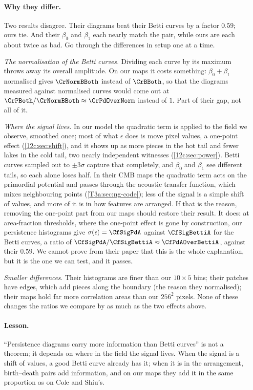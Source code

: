 \paragraph{Why they differ.} Two results disagree. Their diagrams beat their Betti curves by a factor $0.59$; ours tie. And their $\beta_0$ and
$\beta_1$ each nearly match the pair, while ours are each about twice as bad. Go through the differences in setup one at a time.

\emph{The normalisation of the Betti curves.} Dividing each curve by its maximum throws away its overall amplitude. On our maps it costs
something: $\beta_0+\beta_1$ normalised gives $\CrNormBBoth$ instead of $\CrBBoth$, so that the diagrams measured against normalised curves would come out at
$\CrPBoth/\CrNormBBoth\approx\CrPdOverNorm$ instead of $1$. Part of their gap, not all of it.

\emph{Where the signal lives.} In our model the quadratic term is applied to the field we observe, smoothed once; most of what $\epsilon$ does is
move pixel values, a one-point effect (\cref{12c:sec:shift}), and it shows up as more pieces in the hot tail and fewer lakes in the cold tail,
two nearly independent witnesses (\cref{12c:sec:power}). Betti curves sampled out to $\pm3\sigma$ capture that completely, and $\beta_0$ and
$\beta_1$ see different tails, so each alone loses half. In their CMB maps the quadratic term acts on the primordial potential and passes
through the acoustic transfer function, which mixes neighbouring points (\cref{T3a:sec:ng-code}); less of the signal is a simple shift of values,
and more of it is in how features are arranged. If that is the reason, removing the one-point part from our maps should restore their
result. It does: at area-fraction thresholds, where the one-point effect is gone by construction, our persistence histograms give
$\sigma(\epsilon)=\CfSigPdA$ against $\CfSigBettiA$ for the Betti curves, a ratio of $\CfSigPdA/\CfSigBettiA\approx\CfPdAOverBettiA$, against
their $0.59$. We cannot prove from their paper
that this is the whole explanation, but it is the one we can test, and it passes.

\emph{Smaller differences.} Their histograms are finer than our $10\times5$ bins; their patches have edges, which add pieces along the boundary
(the reason they normalised); their maps hold far more correlation areas than our $256^2$ pixels. None of these changes the ratios we compare
by as much as the two effects above.

\paragraph{Lesson.} ``Persistence diagrams carry more information than Betti curves'' is not a theorem; it depends on where in the field the signal
lives. When the signal is a shift of values, a good Betti curve already has it; when it is in the arrangement, birth--death pairs add
information, and on our maps they add it in the same proportion as on Cole and Shiu's.

